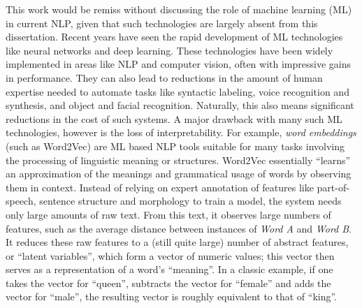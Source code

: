 This work would be remiss without discussing the role of machine learning (ML) in current NLP, given that such technologies are largely absent from this dissertation. Recent years have seen the rapid development of ML technologies like neural networks and deep learning.  These technologies have been widely implemented in areas like NLP and computer vision, often with impressive gains in performance. They can also lead to reductions in the amount of human expertise needed to automate tasks like syntactic labeling, voice recognition and synthesis, and object and facial recognition.  Naturally, this also means significant reductions in the cost of such systems. A major drawback with many such ML technologies, however is the loss of interpretability. For example, \textit{word embeddings} (such as Word2Vec)  are ML based NLP tools suitable for many tasks involving the processing of linguistic meaning or structures. Word2Vec essentially ``learns'' an approximation of the meanings and grammatical usage of words by observing them in context. Instead of relying on expert annotation of features like part-of-speech, sentence structure and morphology to train a model, the system needs only large amounts of raw text. From this text, it observes large numbers of features, such as the average distance between instances of \textit{Word A} and \textit{Word B}. It reduces these raw features to a (still quite large) number of abstract features, or ``latent variables'', which form a vector of numeric values; this vector then serves as a representation of a word's ``meaning''. In a classic example, if one takes the vector for ``queen'', subtracts the vector for ``female'' and adds the vector for ``male'', the resulting vector is roughly equivalent to that of ``king''.

